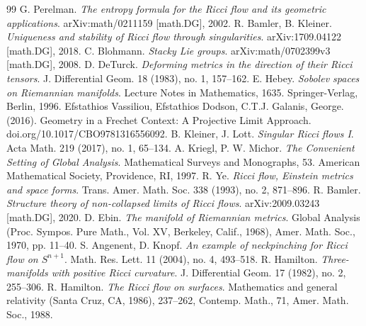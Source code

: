 \documentclass[11pt]{article}
\begin{document}
\begin{thebibliography}{99}
 G. Perelman. \textit{The entropy formula for the Ricci flow and its geometric applications}. arXiv:math/0211159 [math.DG], 2002.
 R. Bamler, B. Kleiner. \textit{Uniqueness and stability of Ricci flow through singularities}. arXiv:1709.04122 [math.DG], 2018.
 C. Blohmann. \textit{Stacky Lie groups}. arXiv:math/0702399v3 [math.DG],  2008.
 D. DeTurck. \textit{Deforming metrics in the direction of their Ricci tensors}. J. Differential Geom. 18 (1983), no. 1, 157--162.
 E. Hebey. \textit{Sobolev spaces on Riemannian manifolds}. Lecture Notes in Mathematics, 1635. Springer-Verlag, Berlin, 1996.
 Efstathios Vassiliou, Efstathios  Dodson, C.T.J.  Galanis, George. (2016). Geometry in a Frechet Context: A Projective Limit Approach. doi.org/10.1017/CBO9781316556092. 
 B. Kleiner, J. Lott. \textit{Singular Ricci flows I}. Acta Math. 219 (2017), no. 1, 65--134.
 A. Kriegl, P. W. Michor. \textit{The Convenient Setting of Global Analysis}. Mathematical Surveys and Monographs, 53. American Mathematical Society, Providence, RI, 1997.
 R. Ye. \textit{Ricci flow, Einstein metrics and space forms}. Trans. Amer. Math. Soc. 338 (1993), no. 2, 871--896.
 R. Bamler. \textit{Structure theory of non-collapsed limits of Ricci flows}. arXiv:2009.03243 [math.DG], 2020.
 D. Ebin. \textit{The manifold of Riemannian metrics}. Global Analysis (Proc. Sympos. Pure Math., Vol. XV, Berkeley, Calif., 1968), Amer. Math. Soc., 1970, pp. 11--40.
 S. Angenent, D. Knopf. \textit{An example of neckpinching for Ricci flow on $S^{n+1}$}. Math. Res. Lett. 11 (2004), no. 4, 493--518.
 R. Hamilton. \textit{Three-manifolds with positive Ricci curvature}. J. Differential Geom. 17 (1982), no. 2, 255--306.
 R. Hamilton. \textit{The Ricci flow on surfaces}. Mathematics and general relativity (Santa Cruz, CA, 1986), 237--262, Contemp. Math., 71, Amer. Math. Soc., 1988.
\end{thebibliography}
\end{document}
